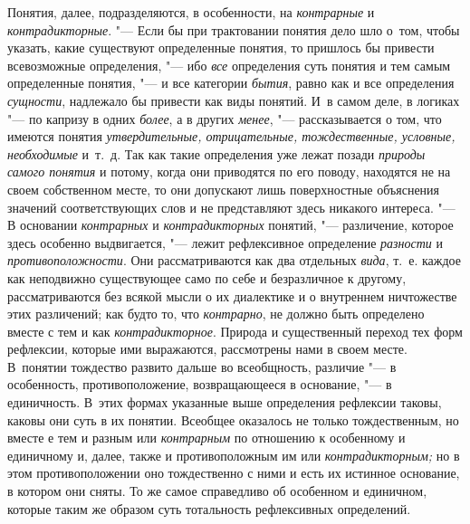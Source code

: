 Понятия, далее, подразделяются, в особенности, на {\em контрарные} и
{\em контрадикторные}. "--- Если бы при трактовании понятия дело шло о~том,
чтобы указать, какие существуют определенные понятия, то пришлось бы привести
всевозможные определения, "--- ибо {\em все} определения суть понятия и тем
самым определенные понятия, "--- и все категории {\em бытия}, равно как и все
определения {\em сущности}, надлежало бы привести как виды понятий. И~в самом
деле, в логиках "--- по капризу в одних {\em более}, а в других {\em менее},
"--- рассказывается о том, что имеются понятия {\em утвердительные,
отрицательные, тождественные, условные, необходимые} и~т.~д. Так как такие
определения уже лежат позади {\em природы самого понятия} и потому, когда они
приводятся по его поводу, находятся не на своем собственном месте, то они
допускают лишь поверхностные объяснения значений соответствующих слов и не
представляют здесь никакого интереса. "--- В основании {\em контрарных} и {\em
контрадикторных} понятий, "--- различение, которое здесь особенно выдвигается,
"--- лежит рефлексивное определение {\em разности} и {\em противоположности}.
Они рассматриваются как два отдельных {\em вида}, т.~е. каждое как неподвижно
существующее само по себе и безразличное к другому, рассматриваются без всякой
мысли о их диалектике и о внутреннем ничтожестве этих различений; как будто то,
что {\em контрарно}, не должно быть определено вместе с тем и как {\em
контрадикторное}. Природа и существенный переход тех форм рефлексии, которые
ими выражаются, рассмотрены нами в своем месте. В~понятии тождество развито
дальше во всеобщность, различие "--- в особенность, противоположение,
возвращающееся в основание, "--- в единичность. В~этих формах указанные выше
определения рефлексии таковы, каковы они суть в их понятии. Всеобщее оказалось
не только тождественным, но вместе е тем и разным или {\em контрарным} по
отношению к особенному и единичному и, далее, также и противоположным им или
{\em контрадикторным;} но в этом противоположении оно тождественно с ними и
есть их истинное основание, в котором они сняты. То же самое
справедливо об особенном и единичном, которые таким же
образом суть тотальность рефлексивных определений.


